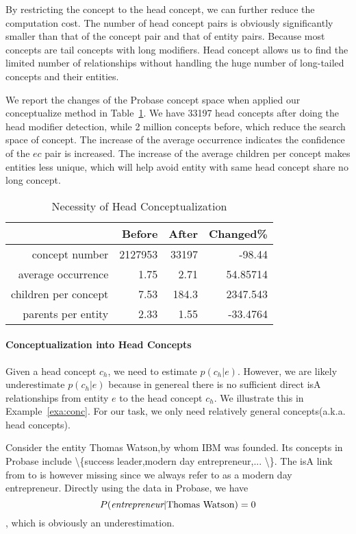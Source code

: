 By restricting the concept to the head concept, we can further reduce the computation cost.
The number of head concept pairs is obviously significantly smaller than that of the concept pair and that of entity pairs. 
Because most concepts are tail concepts with long modifiers. 
Head concept allows us to find the limited number of relationships without handling the huge number of long-tailed concepts and their entities.

We report the changes of the Probase concept space when applied our conceptualize method in Table~\ref{tab:nhc}.
We have 33197 head concepts after doing the head modifier detection, while 2 million concepts before, which reduce the search space of concept.
The increase of the average occurrence indicates the confidence of the $e$\isa$c$ pair is increased.
The increase of the average children per concept makes entities less unique, which will help avoid entity with same head concept share no long concept.

\begin{table}[htbp]
  \centering
  \caption{Necessity of Head Conceptualization}
    \begin{tabular}{rrrr}
    \toprule
          & Before & After & Changed\% \\
    \midrule
    concept number & 2127953 & 33197 & -98.44 \\
    average occurrence & 1.75  & 2.71  & 54.85714 \\
    children per concept & 7.53  & 184.3 & 2347.543 \\
    parents per entity & 2.33  & 1.55  & -33.4764 \\
    \bottomrule
    \end{tabular}%
  \label{tab:nhc}%
\end{table}%



\paragraph{Conceptualization into Head Concepts}

Given a head concept $c_h$, we need to estimate $p(c_h|e)$. However, we are likely underestimate $p(c_h|e)$ because in genereal there is no sufficient direct isA relationships from entity $e$ to the head concept $c_h$. We illustrate this in Example~\ref{exa:conc}. For our task, we only need relatively general concepts(a.k.a. head concepts).
\begin{example}
\label{exa:conc}
Consider the entity \ac{Thomas Watson},by whom \ac{IBM} was founded. Its concepts in Probase include \ac{\{success leader,modern day entrepreneur,... \}}. The isA link from  to  is however missing since we always refer to  as a modern day entrepreneur. Directly using the data in Probase, we have $$P(\emph{entrepreneur}|{\tt \text{Thomas Watson}})=0$$, which is obviously an underestimation.
\end{example}


